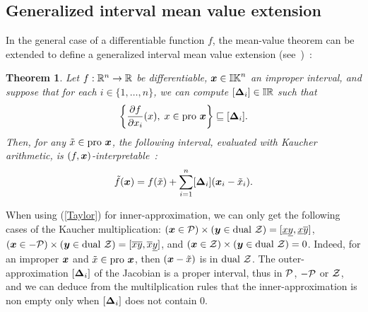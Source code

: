 \documentclass{sig-alternate-05-2015} %
\newtheorem{theorem}{Theorem}
\newcommand{\dual}{\mbox{dual }}
\newcommand{\pro}{\mbox{pro }}
\def\bbr{{\Bbb R}}
\def\I{{\Bbb I \Bbb R}}
\def\K{{\Bbb I \Bbb K}}
\begin{document}
\subsection{Generalized interval mean value extension}
\label{generalizedmean}
In the general case of a differentiable function $f$, the mean-value theorem can be extended to define 
a generalized interval mean value extension (see~\cite{gold1})~:
\begin{theorem}
\label{thm1}
Let $f : \bbr^n \rightarrow \bbr$ be differentiable, $\x \in \K^n$ an improper interval, 
and suppose that for each $i \in \{1,\ldots,n\}$, we can compute $[\bfm{\Delta}_i] \in \I$ such that 
\begin{equation} 
\left\{ \frac{\partial f}{\partial x_i} (x), \; x \in \pro \x \right\} 
\sqsubseteq [\bfm{\Delta}_i].
\label{delta1} 
\end{equation}
Then, for any $\tilde x \in \pro \x$, the following interval, evaluated with Kaucher arithmetic, is $(f,\x)$-interpretable~:
\begin{equation}
\tilde{f}(\x) = f(\tilde x) + \sum\limits_{i=1}^{n} [\bfm{\Delta}_i] (\x_i - \tilde{x}_i).
\label{Taylor}
\end{equation}
\end{theorem}

When using (\ref{Taylor}) for inner-approximation, we can only get the following cases of the Kaucher multiplication: 
$(\x \in {\cal P}) \times (\y \in \dual {\cal Z})=[\underline x \underline y, \underline x \overline y]$, 
 $(\x \in -{\cal P}) \times (\y \in \dual {\cal Z})=[\overline x \overline y, \overline x \underline y]$, 
and  $(\x \in {\cal Z}) \times (\y \in \dual {\cal Z})=0$.
Indeed, for an improper $\x$ and $\tilde x \in \pro \x$, then $(\x - \tilde{x})$ is in $\dual {\cal Z}$. 
The outer-approximation  $[\bfm{\Delta}_i] $ of the Jacobian is a proper interval, thus in ${\cal P}$, $-{\cal P}$ or ${\cal Z}$, 
and we can deduce from the multilplication rules that the inner-approximation is non empty only when $[\bfm{\Delta}_i]$ does not contain 0.
\end{document}
